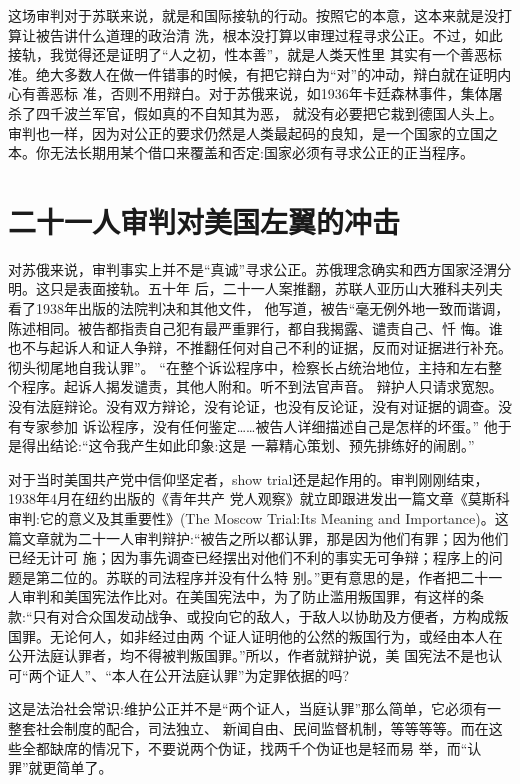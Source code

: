 \documentclass[10pt]{article}
\begin{document}
{这场审判对于苏联来说，就是和国际接轨的行动。按照它的本意，这本来就是没打算让被告讲什么道理的政治清
洗，根本没打算以审理过程寻求公正。不过，如此接轨，我觉得还是证明了``人之初，性本善''，就是人类天性里
其实有一个善恶标准。绝大多数人在做一件错事的时候，有把它辩白为``对''的冲动，辩白就在证明内心有善恶标
准，否则不用辩白。对于苏俄来说，如1936年卡廷森林事件，集体屠杀了四千波兰军官，假如真的不自知其为恶，
就没有必要把它栽到德国人头上。审判也一样，因为对公正的要求仍然是人类最起码的良知，是一个国家的立国之
本。你无法长期用某个借口来覆盖和否定:国家必须有寻求公正的正当程序。


\pagebreak
\section{二十一人审判对美国左翼的冲击}

对苏俄来说，审判事实上并不是``真诚''寻求公正。苏俄理念确实和西方国家泾渭分明。这只是表面接轨。五十年
后，二十一人案推翻，苏联人亚历山大\textperiodcentered 雅科夫列夫看了1938年出版的法院判决和其他文件，
他写道，被告``毫无例外地一致而谐调，陈述相同。被告都指责自己犯有最严重罪行，都自我揭露、谴责自己、忏
悔。谁也不与起诉人和证人争辩，不推翻任何对自己不利的证据，反而对证据进行补充。彻头彻尾地自我认罪''。
``在整个诉讼程序中，检察长占统治地位，主持和左右整个程序。起诉人揭发谴责，其他人附和。听不到法官声音。
辩护人只请求宽恕。没有法庭辩论。没有双方辩论，没有论证，也没有反论证，没有对证据的调查。没有专家参加
诉讼程序，没有任何鉴定……被告人详细描述自己是怎样的坏蛋。'' 他于是得出结论:``这令我产生如此印象:这是
一幕精心策划、预先排练好的闹剧。''

对于当时美国共产党中信仰坚定者，show trial还是起作用的。审判刚刚结束，1938年4月在纽约出版的《青年共产
党人观察》就立即跟进发出一篇文章《莫斯科审判:它的意义及其重要性》(The Moscow Trial:Its Meaning and
Importance)。这篇文章就为二十一人审判辩护:``被告之所以都认罪，那是因为他们有罪；因为他们已经无计可
施；因为事先调查已经摆出对他们不利的事实无可争辩；程序上的问题是第二位的。苏联的司法程序并没有什么特
别。''更有意思的是，作者把二十一人审判和美国宪法作比对。在美国宪法中，为了防止滥用叛国罪，有这样的条
款:``只有对合众国发动战争、或投向它的敌人，于敌人以协助及方便者，方构成叛国罪。无论何人，如非经过由两
个证人证明他的公然的叛国行为，或经由本人在公开法庭认罪者，均不得被判叛国罪。''所以，作者就辩护说，美
国宪法不是也认可``两个证人''、``本人在公开法庭认罪''为定罪依据的吗?

这是法治社会常识:维护公正并不是``两个证人，当庭认罪''那么简单，它必须有一整套社会制度的配合，司法独立、
新闻自由、民间监督机制，等等等等。而在这些全都缺席的情况下，不要说两个伪证，找两千个伪证也是轻而易
举，而``认罪''就更简单了。

}
\end{document}
